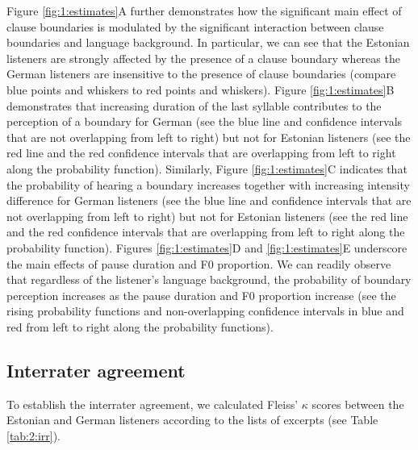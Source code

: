 \documentclass[output=paper]{langscibook}
\begin{document}
    \begin{sloppypar}
    Figure \ref{fig:1:estimates}A further demonstrates how the significant main effect of clause boundaries is modulated by the significant interaction between clause boundaries and language background. In particular, we can see that the Estonian listeners are strongly affected by the presence of a clause boundary whereas the German listeners are insensitive to the presence of clause boundaries (compare blue points and whiskers to red points and whiskers). Figure \ref{fig:1:estimates}B demonstrates that increasing duration of the last syllable contributes to the perception of a boundary for German (see the blue line and confidence intervals that are not overlapping from left to right) but not for Estonian listeners (see the red line and the red confidence intervals that are overlapping from left to right along the probability function). Similarly, Figure \ref{fig:1:estimates}C indicates that the probability of hearing a boundary increases together with increasing intensity difference for German listeners (see the blue line and confidence intervals that are not overlapping from left to right) but not for Estonian listeners (see the red line and the red confidence intervals that are overlapping from left to right along the probability function). Figures \ref{fig:1:estimates}D and \ref{fig:1:estimates}E underscore the main effects of pause duration and F0 proportion. We can readily observe that regardless of the listener’s language background, the probability of boundary perception increases as the pause duration and F0 proportion increase (see the rising probability functions and non-overlapping confidence intervals in blue and red from left to right along the probability functions).
    \end{sloppypar}
    
    \subsection{Interrater agreement}

    To establish the interrater agreement, we calculated Fleiss’ $\kappa$ scores between the Estonian and German listeners according to the lists of excerpts (see Table \ref{tab:2:irr}).
\end{document}
